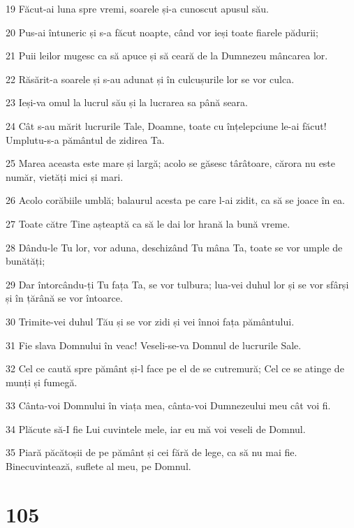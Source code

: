\par 19 Făcut-ai luna spre vremi, soarele și-a cunoscut apusul său.
\par 20 Pus-ai întuneric și s-a făcut noapte, când vor ieși toate fiarele pădurii;
\par 21 Puii leilor mugesc ca să apuce și să ceară de la Dumnezeu mâncarea lor.
\par 22 Răsărit-a soarele și s-au adunat și în culcușurile lor se vor culca.
\par 23 Ieși-va omul la lucrul său și la lucrarea sa până seara.
\par 24 Cât s-au mărit lucrurile Tale, Doamne, toate cu înțelepciune le-ai făcut! Umplutu-s-a pământul de zidirea Ta.
\par 25 Marea aceasta este mare și largă; acolo se găsesc târâtoare, cărora nu este număr, vietăți mici și mari.
\par 26 Acolo corăbiile umblă; balaurul acesta pe care l-ai zidit, ca să se joace în ea.
\par 27 Toate către Tine așteaptă ca să le dai lor hrană la bună vreme.
\par 28 Dându-le Tu lor, vor aduna, deschizând Tu mâna Ta, toate se vor umple de bunătăți;
\par 29 Dar întorcându-ți Tu fața Ta, se vor tulbura; lua-vei duhul lor și se vor sfârși și în țărână se vor întoarce.
\par 30 Trimite-vei duhul Tău și se vor zidi și vei înnoi fața pământului.
\par 31 Fie slava Domnului în veac! Veseli-se-va Domnul de lucrurile Sale.
\par 32 Cel ce caută spre pământ și-l face pe el de se cutremură; Cel ce se atinge de munți și fumegă.
\par 33 Cânta-voi Domnului în viața mea, cânta-voi Dumnezeului meu cât voi fi.
\par 34 Plăcute să-I fie Lui cuvintele mele, iar eu mă voi veseli de Domnul.
\par 35 Piară păcătoșii de pe pământ și cei fără de lege, ca să nu mai fie. Binecuvintează, suflete al meu, pe Domnul.

\chapter{105}

